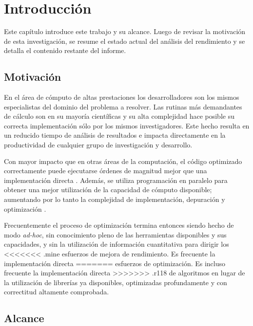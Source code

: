 \documentclass[a4paper]{report}
\begin{document}
\tableofcontents

\chapter{Introducci\'on}

Este cap\'itulo introduce este trabajo y su alcance. Luego de revisar la
motivaci\'on de esta investigaci\'on, se resume el estado actual del an\'alisis
del rendimiento y se detalla el contenido restante del informe.

\section{Motivaci\'on}

En el \'area de c\'omputo de altas prestaciones los desarrolladores son los mismos
especialistas del dominio del problema a resolver. Las rutinas
m\'as demandantes de c\'alculo son en su mayor\'ia cient\'ificas y su
alta complejidad hace posible su correcta implementaci\'on s\'{o}lo por los mismos investigadores.
Este hecho resulta en un reducido tiempo de an\'alisis de resultados
e impacta directamente en la productividad de cualquier grupo de investigaci\'on y
desarrollo.

\bigskip

Con mayor impacto que en otras \'areas de la computaci\'on, el c\'odigo
optimizado correctamente puede ejecutarse \'ordenes de magnitud mejor que una implementaci\'on
directa \cite{mm-matrixmultiplicationtool}. Adem\'as, se utiliza
programaci\'on en paralelo para obtener una mejor utilizaci\'on de la
capacidad de c\'omputo disponible; aumentando por lo tanto la complejidad de
implementaci\'on, depuraci\'on y optimizaci\'on \cite{parallel-programming}.

\bigskip

Frecuentemente el proceso de optimizaci\'on termina entonces siendo
hecho de modo {\it ad-hoc}, sin conocimiento pleno de las herramientas disponibles y
sus capacidades, y sin la utilizaci\'on de informaci\'on cuantitativa para dirigir los
<<<<<<< .mine
esfuerzos de mejora de rendimiento. Es frecuente la implementaci\'on directa
=======
esfuerzos de optimizaci\'on. Es incluso frecuente la implementaci\'on directa
>>>>>>> .r118
de algoritmos en lugar de la utilizaci\'on de librer\'ias ya disponibles, optimizadas
profundamente y con correctitud altamente comprobada.

\section{Alcance}
\end{document}
